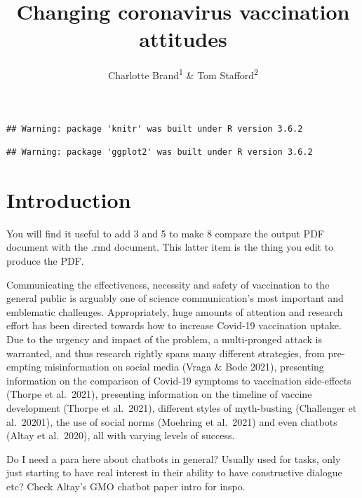 \documentclass[
  english,
  ,jou,floatsintext]{apa6}
\title{Changing coronavirus vaccination attitudes}
\author{Charlotte Brand\textsuperscript{1} \& Tom Stafford\textsuperscript{2}}
\date{}
\affiliation{\vspace{0.5cm}\textsuperscript{1} University of Sheffield\\\textsuperscript{2} University of Sheffield}
\begin{document}
\maketitle

\begin{verbatim}
## Warning: package 'knitr' was built under R version 3.6.2
\end{verbatim}

\begin{verbatim}
## Warning: package 'ggplot2' was built under R version 3.6.2
\end{verbatim}

\hypertarget{introduction}{%
\section{Introduction}\label{introduction}}

You will find it useful to add 3 and 5 to make 8 compare the output PDF document with the .rmd document. This latter item is the thing you edit to produce the PDF.

Communicating the effectiveness, necessity and safety of vaccination to the general public is arguably one of science communication's most important and emblematic challenges. Appropriately, huge amounts of attention and research effort has been directed towards how to increase Covid-19 vaccination uptake. Due to the urgency and impact of the problem, a multi-pronged attack is warranted, and thus research rightly spans many different strategies, from pre-empting misinformation on social media (Vraga \& Bode 2021), presenting information on the comparison of Covid-19 symptoms to vaccination side-effects (Thorpe et al.~2021), presenting information on the timeline of vaccine development (Thorpe et al.~2021), different styles of myth-busting (Challenger et al.~20201), the use of social norms (Moehring et al.~2021) and even chatbots (Altay et al.~2020), all with varying levels of success.

Do I need a para here about chatbots in general? Usually used for tasks, only just starting to have real interest in their ability to have constructive dialogue etc? Check Altay's GMO chatbot paper intro for inspo.
\end{document}

